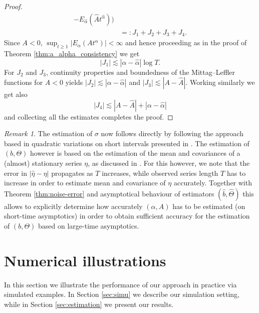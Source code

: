 \documentclass[11pt,reqno,oneside, a4paper]{amsart}
\numberwithin{equation}{section}
\theoremstyle{remark}
\newtheorem{remark}[thm]{Remark}
\begin{document}
\begin{proof}
\begin{align*}
	-
	E_{\hat\alpha}(\hat A t^{\hat\alpha})
	\Big) \\
    &=: J_1+J_2+J_3+J_4.
\end{align*}
Since $A<0$, $\sup_{t\geq1}
|E_\alpha(At^\alpha)|
<\infty$ and hence proceeding as in the proof of Theorem \ref{thm:a_alpha_consistency} we get
$$
|J_1|\lesssim |\alpha - \hat\alpha|\log T.
$$
For $J_2$ and $J_3$, continuity properties and boundedness of the Mittag--Leffler functions for $A<0$ yields 
$
|J_2| \lesssim |\alpha-\hat\alpha|
$
and
$
|J_3| \lesssim |A- \hat{A}|.
$
Working similarly we get also
$$
|J_4| \lesssim |A - \hat{A}|+ |\alpha - \hat\alpha|
$$
and collecting all the estimates completes the proof.




\end{proof}
\begin{remark}
    The estimation of $\sigma$ now follows directly by following the approach based in quadratic variations on short intervals presented in \cite{Vasicek2025}. The estimation of $(b,\Theta)$ however is based on the estimation of the mean and covariances of a (almost) stationary series $\eta$, as discussed in \cite{Vasicek2025}. For this however, we note that the error in $|\hat\eta -\eta|$ propagates as $T$ increases, while observed series length $T$ has to increase in order to estimate mean and covariance of $\eta$ accurately. Together with Theorem \ref{thm:noise-error} and asymptotical behaviour of estimators $(\hat{b},\hat{\Theta})$ this allows to explicitly determine how accurately $(\alpha,A)$ has to be estimated (on short-time asymptotics) in order to obtain sufficient accuracy for the estimation of $(b,\Theta)$ based on large-time asymptotics.
\end{remark}


\section{Numerical illustrations}
\label{sec:simulations}
In this section we illustrate the performance of our approach in practice via simulated examples. In Section \ref{sec:simu} we describe our simulation setting, while in Section \ref{sec:estimation} we present our results.
\end{document}

